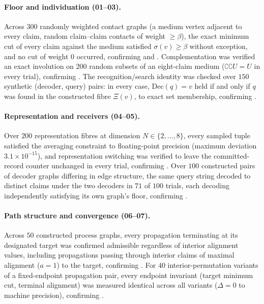\documentclass[11pt,twocolumn,a4paper]{article}
\theoremstyle{thmstyle}
\theoremstyle{definition}
\theoremstyle{remark}
\newcommand{\flo}{\beta}
\newcommand{\co}{\complement}
\newcommand{\str}{\sigma}
\newcommand{\Proj}{\Xi}
\begin{document}
\paragraph{Floor and individuation (01--03).}
Across $300$ randomly weighted contact graphs (a medium vertex adjacent to
every claim, random claim--claim contacts of weight $\ge\flo$), the exact
minimum cut of every claim against the medium satisfied $\str(v)\ge\flo$
without exception, and no cut of weight $0$ occurred, confirming
 and . Complementation was verified an
exact involution on $200$ random subsets of an eight-claim medium
($\co\co U=U$ in every trial), confirming . The
recognition/search identity was checked over $150$ synthetic
(decoder, query) pairs: in every case, $\mathrm{Dec}(q)=v$ held if and only
if $q$ was found in the constructed fibre $\Proj(v)$, to exact set
membership, confirming .

\paragraph{Representation and receivers (04--05).}
Over $200$ representation fibres at dimension $N\in\{2,\dots,8\}$, every
sampled tuple satisfied the averaging constraint to floating-point
precision (maximum deviation $3.1\times10^{-15}$), and representation
switching was verified to leave the committed-record counter unchanged in
every trial, confirming . Over $100$ constructed
pairs of decoder graphs differing in edge structure, the same query string
decoded to distinct claims under the two decoders in $71$ of $100$ trials,
each decoding independently satisfying its own graph's floor, confirming
.

\paragraph{Path structure and convergence (06--07).}
Across $50$ constructed process graphs, every propagation terminating at
its designated target was confirmed admissible regardless of interior
alignment values, including propagations passing through interior claims
of maximal alignment ($a=1$) to the target, confirming
. For $40$ interior-permutation variants of a
fixed-endpoint propagation pair, every endpoint invariant (target minimum
cut, terminal alignment) was measured identical across all variants
($\Delta=0$ to machine precision), confirming .
\end{document}
